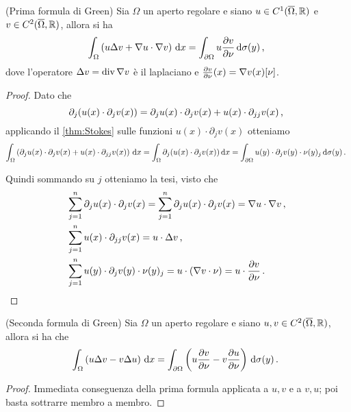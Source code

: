 \begin{corollary}(Prima formula di Green)
	Sia $\Omega$ un aperto regolare e siano $u\in C^1(\overline\Omega, \mathbb R)$ e $v\in C^2(\overline\Omega, \mathbb R)$, allora si ha
	\[
		\int_{\Omega} \left( u \Delta v+ \nabla u\cdot\nabla v \right) \,\mathrm d x=
		\int_{\partial\Omega} u \frac{\partial v}{\partial \nu} \,\mathrm d \sigma(y) \, \text{, }
	\]
	dove l'operatore $\Delta v = \operatorname{div} \nabla v$ è il laplaciano e $\frac{\partial v}{\partial \nu}(x)=\nabla v(x)[\nu]$.
\end{corollary}
\begin{proof}
	Dato che
	\begin{equation*}
		\partial_j (u(x)\cdot\partial_j v(x) ) = \partial_j u(x)\cdot \partial_j v(x) + u(x)\cdot\partial_{jj} v(x)\, \text{, }
	\end{equation*}
	applicando il \cref{thm:Stokes} sulle funzioni $u(x)\cdot\partial_j v(x)$ otteniamo
	\[
		\int_{\Omega} \left(\partial_j u(x)\cdot \partial_j v(x) + u(x)\cdot\partial_{jj} v(x) \right)\,\mathrm d x = 
		\int_{\Omega} \partial_j (u(x)\cdot\partial_j v(x)) \,\mathrm d x =
		\int_{\partial \Omega} u(y)\cdot\partial_j v(y)\cdot\nu(y)_j \,\mathrm d \sigma(y)\, \text{. }
	\]
	
	Quindi sommando su $j$ otteniamo la tesi, visto che
	\begin{align*}
		&\sum_{j=1}^n \partial_j u(x) \cdot\partial_j v(x) = \sum_{j=1}^n \partial_j u(x) \cdot\partial_j v(x) = \nabla u\cdot\nabla v \, \text{, }\\
		&\sum_{j=1}^n u(x)\cdot\partial_{jj} v(x) = u \cdot\Delta v\, \text{, }\\
		&\sum_{j=1}^n u(y)\cdot\partial_j v(y)\cdot\nu(y)_j = u\cdot (\nabla v\cdot \nu)=u \cdot\frac{\partial v}{\partial \nu}\, \text{. }
	\end{align*}
\end{proof}

\begin{corollary}(Seconda formula di Green)
	Sia $\Omega$ un aperto regolare e siano $u,v\in C^2(\overline\Omega, \mathbb R)$, allora si ha che
	\[
		\int_{\Omega}\left(u\Delta v-v\Delta u\right) \,\mathrm d x=
		\int_{\partial\Omega}\left(u\frac{\partial v}{\partial\nu}-v\frac{\partial u}{\partial\nu}\right) \,\mathrm d \sigma(y)\, \text{. }
	\]
\end{corollary}

\begin{proof}
	Immediata conseguenza della prima formula applicata a $u,v$ e a $v,u$; poi basta sottrarre membro a membro.
\end{proof}


